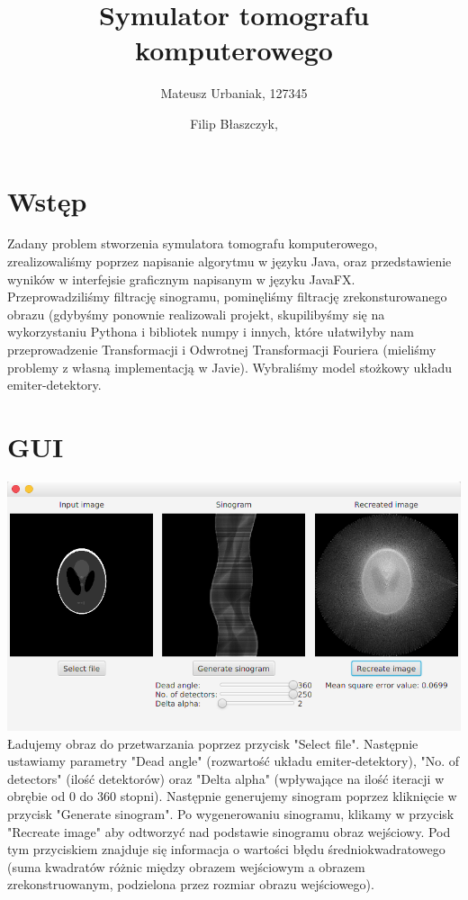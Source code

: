 \documentclass[a4paper,11pt]{article}
\title {Symulator tomografu komputerowego}
\author{Mateusz Urbaniak, 127345 \and Filip Błaszczyk,}
\begin{document}
\maketitle

\section{Wstęp}
Zadany problem stworzenia symulatora tomografu komputerowego, zrealizowaliśmy poprzez napisanie algorytmu w języku Java, oraz przedstawienie wyników w interfejsie graficznym napisanym w języku JavaFX. Przeprowadziliśmy filtrację sinogramu, pominęliśmy filtrację zrekonsturowanego obrazu (gdybyśmy ponownie realizowali projekt, skupilibyśmy się na wykorzystaniu Pythona i bibliotek numpy i innych, które ułatwiłyby nam przeprowadzenie Transformacji i Odwrotnej Transformacji Fouriera (mieliśmy problemy z własną implementacją w Javie). Wybraliśmy model stożkowy układu emiter-detektory.

\section{GUI}
\includegraphics[width=\textwidth]{GUI}
Ładujemy obraz do przetwarzania poprzez przycisk "Select file".
Następnie ustawiamy parametry "Dead angle" (rozwartość układu emiter-detektory), "No. of detectors" (ilość detektorów) oraz "Delta alpha" (wpływające na ilość iteracji w obrębie od 0 do 360 stopni). Następnie generujemy sinogram poprzez kliknięcie w przycisk "Generate sinogram". Po wygenerowaniu sinogramu, klikamy w przycisk "Recreate image" aby odtworzyć nad podstawie sinogramu obraz wejściowy. Pod tym przyciskiem znajduje się informacja o wartości błędu średniokwadratowego (suma kwadratów różnic między obrazem wejściowym a obrazem zrekonstruowanym, podzielona przez rozmiar obrazu wejściowego).
\end{document}
